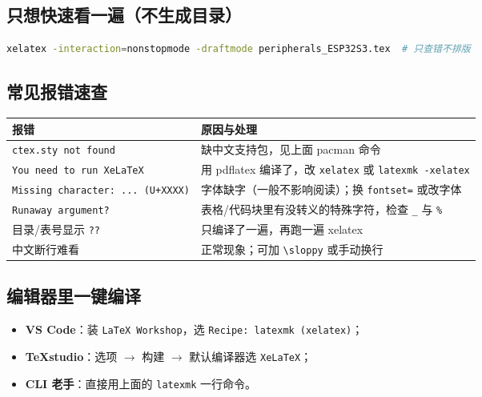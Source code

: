 \documentclass[UTF8,a4paper,11pt,fontset=fandol]{ctexart}
\newcommand{\fld}[1]{\texttt{#1}}
\begin{document}
\subsection{只想快速看一遍（不生成目录）}

\begin{lstlisting}[language=bash]
xelatex -interaction=nonstopmode -draftmode peripherals_ESP32S3.tex  # 只查错不排版
\end{lstlisting}

\subsection{常见报错速查}

\begin{center}
\small
\begin{tabular}{@{}p{6.0cm}p{9.2cm}@{}}
\toprule
报错 & 原因与处理 \\
\midrule
\fld{ctex.sty not found} & 缺中文支持包，见上面 pacman 命令 \\
\fld{You need to run XeLaTeX} & 用 pdflatex 编译了，改 \fld{xelatex} 或 \fld{latexmk -xelatex} \\
\fld{Missing character: ... (U+XXXX)} & 字体缺字（一般不影响阅读）；换 \fld{fontset=} 或改字体 \\
\fld{Runaway argument?} & 表格/代码块里有没转义的特殊字符，检查 \fld{\_} 与 \fld{\%} \\
目录/表号显示 \fld{??} & 只编译了一遍，再跑一遍 xelatex \\
中文断行难看 & 正常现象；可加 \fld{\textbackslash sloppy} 或手动换行 \\
\bottomrule
\end{tabular}
\end{center}

\subsection{编辑器里一键编译}

\begin{itemize}
  \item \textbf{VS Code}：装 \fld{LaTeX Workshop}，选 \fld{Recipe: latexmk (xelatex)}；
  \item \textbf{TeXstudio}：选项 $\rightarrow$ 构建 $\rightarrow$ 默认编译器选 \fld{XeLaTeX}；
  \item \textbf{CLI 老手}：直接用上面的 \fld{latexmk} 一行命令。
\end{itemize}

\newpage
\end{document}

